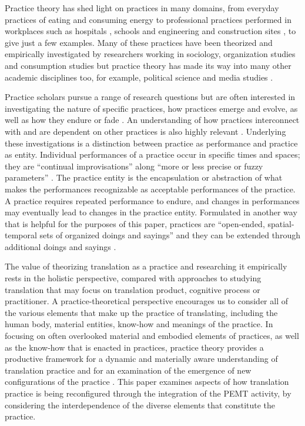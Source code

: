 \documentclass[output=paper,colorlinks,citecolor=brown]{langsci/langscibook}
\begin{document}
Practice theory has shed light on practices in many domains, from everyday practices of eating \citep{warde_practice_2016} and consuming energy \citep{shove_conceptualizing_2015} to professional practices performed in workplaces such as hospitals \citep{nicolini_practice_2011}, schools \citep{kemmis_ecologies_2012} and engineering and construction sites \citep{buch_studying_2015}, to give just a few examples. Many of these practices have been theorized and empirically investigated by researchers working in sociology, organization studies and consumption studies but practice theory has made its way into many other academic disciplines too, for example, political science \citep{jonas_praxeological_2017} and media studies \citep{brauchler_theorising_2010}. 

Practice scholars pursue a range of research questions but are often interested in investigating the nature of specific practices, how practices emerge and evolve, as well as how they endure or fade \citep{shove_dynamics_2012,schatzki_social_2019}. An understanding of how practices interconnect with and are dependent on other practices is also highly relevant \citep{hui_nexus_2017,spaargaren_practice_2016}. Underlying these investigations is a distinction between practice as performance and practice as entity. Individual performances of a practice occur in specific times and spaces; they are \enquote{continual improvisations} along \enquote{more or less precise or fuzzy parameters} \citep[46]{warde_practice_2016}. The practice entity is the encapsulation or abstraction of what makes the performances recognizable as acceptable performances of the practice. A practice requires repeated performance to endure, and changes in performances may eventually lead to changes in the practice entity. Formulated in another way that is helpful for the purposes of this paper, practices are \enquote{open-ended, spatial-temporal sets of organized doings and sayings} and they can be extended through additional doings and sayings \citep[28]{schatzki_social_2019}. 

The value of theorizing translation as a practice and researching it empirically rests in the holistic perspective, compared with approaches to studying translation that may focus on translation product, cognitive process or practitioner. A practice-theoretical perspective encourages us to consider all of the various elements that make up the practice of translating, including the human body, material entities, know-how and meanings of the practice. In focusing on often overlooked material and embodied elements of practices, as well as the know-how that is enacted in practices, practice theory provides a productive framework for a dynamic and materially aware understanding of translation practice and for an examination of the emergence of new configurations of the practice \citep{olohan_translation_2021}. This paper examines aspects of how translation practice is being reconfigured through the integration of the PEMT activity, by considering the interdependence of the diverse elements that constitute the practice.
\end{document}
